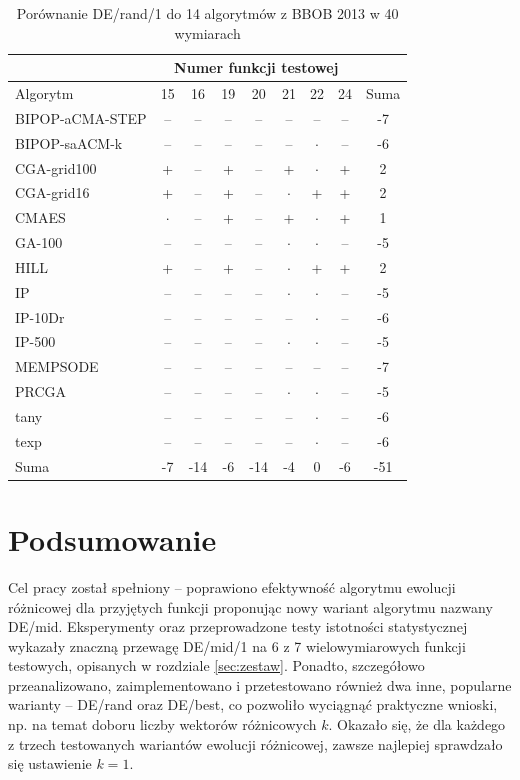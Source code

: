\documentclass[a4paper,onecolumn,oneside,12pt,wide,floatssmall]{mwrep}
\theoremstyle{definition}
\theoremstyle{plain}%
\theoremstyle{remark}
\begin{document}
\begin{table}[H]
\centering
\begin{tabular}{ | l | c | c | c | c | c | c | c | c | }
\hline		 & \multicolumn{7}{c|}{Numer funkcji testowej} & \\  \hline
Algorytm         &15& 16& 19& 20& 21& 22& 24 & Suma \\  \hline
BIPOP-aCMA-STEP	 & -- & -- & -- & -- & -- & -- & -- & -7 \\
BIPOP-saACM-k	 & -- & -- & -- & -- & -- & $\cdot$ & -- & -6 \\
CGA-grid100	 & + & -- & + & -- & + & $\cdot$ & + & 2 \\
CGA-grid16	 & + & -- & + & -- & $\cdot$ & + & + & 2\\
CMAES	 & $\cdot$ & -- & + & -- & + & $\cdot$ & + & 1 \\
GA-100	 & -- & -- & -- & -- & $\cdot$ & $\cdot$ & -- & -5 \\
HILL	 & + & -- & + & -- & $\cdot$ & + & + & 2 \\
IP	 & -- & -- & -- & -- & $\cdot$ & $\cdot$ & -- & -5 \\
IP-10Dr	 & -- & -- & -- & -- & -- & $\cdot$ & -- & -6 \\
IP-500	 & -- & -- & -- & -- & $\cdot$ & $\cdot$ & -- & -5\\
MEMPSODE	 & -- & -- & -- & -- & -- & -- & -- & -7 \\
PRCGA	 & -- & -- & -- & -- & $\cdot$ & $\cdot$ & -- & -5\\
tany	 & -- & -- & -- & -- & -- & $\cdot$ & -- & -6 \\
texp	 & -- & -- & -- & -- & -- & $\cdot$ & -- & -6 \\ \hline
Suma     & -7 & -14 & -6 & -14 & -4 & 0 & -6 & -51 \\ \hline
\end{tabular}
\caption{Porównanie DE/rand/1 do 14 algorytmów z BBOB 2013 w 40 wymiarach}
\end{table}

\chapter{Podsumowanie}

Cel pracy został spełniony -- poprawiono efektywność algorytmu ewolucji różnicowej dla przyjętych funkcji
proponując nowy wariant algorytmu nazwany DE/mid. Eksperymenty oraz przeprowadzone testy istotności 
statystycznej wykazały znaczną przewagę DE/mid/1 na 6 z 7 
wielowymiarowych funkcji testowych, opisanych w rozdziale \ref{sec:zestaw}. 
Ponadto, szczegółowo przeanalizowano, zaimplementowano 
i przetestowano również dwa inne, popularne warianty -- DE/rand oraz DE/best, co pozwoliło wyciągnąć 
praktyczne wnioski, np. na temat doboru liczby wektorów różnicowych $k$.
Okazało się, że dla każdego z trzech testowanych wariantów ewolucji różnicowej, zawsze
najlepiej sprawdzało się ustawienie $k = 1$.
\end{document}
